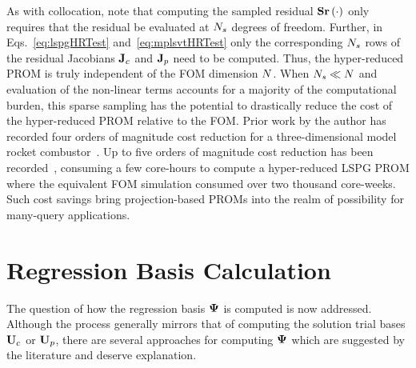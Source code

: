As with collocation, note that computing the sampled residual $\mathbf{S} \mathbf{r}\left(\cdot\right)$ only requires that the residual be evaluated at $N_s$ degrees of freedom. Further, in Eqs.~\ref{eq:lspgHRTest} and~\ref{eq:mplsvtHRTest} only the corresponding $N_s$ rows of the residual Jacobians $\mathbf{J}_{c} $ and $\mathbf{J}_{p}$ need to be computed. Thus, the hyper-reduced PROM is truly independent of the FOM dimension $N$. When $N_s \ll N$ and evaluation of the non-linear terms accounts for a majority of the computational burden, this sparse sampling has the potential to drastically reduce the cost of the hyper-reduced PROM relative to the FOM. Prior work by the author has recorded four orders of magnitude cost reduction for a three-dimensional model rocket combustor~\cite{Wentland2021}. Up to five orders of magnitude cost reduction has been recorded~\cite{Grimberg2021}, consuming a few core-hours to compute a hyper-reduced LSPG PROM where the equivalent FOM simulation consumed over two thousand core-weeks. Such cost savings bring projection-based PROMs into the realm of possibility for many-query applications.

\section{Regression Basis Calculation}\label{sec:regBasis}
%
The question of how the regression basis $\deimBasis$ is computed is now addressed. Although the process generally mirrors that of computing the solution trial bases $\consTrial$ or $\primTrial$, there are several approaches for computing $\deimBasis$ which are suggested by the literature and deserve explanation.

